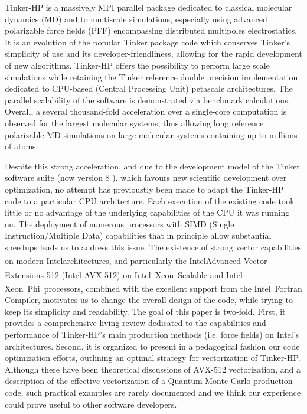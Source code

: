 \documentclass[9pt,comparison]{livecoms}
\newcommand{\rr}{\textsuperscript{\textregistered}}
\newcommand{\tm}{\textsuperscript{\texttrademark}}
\begin{document}
\hspace{\parindent}Tinker-HP is a massively MPI parallel package dedicated to classical molecular dynamics (MD) and to multiscale simulations, especially using advanced polarizable force fields (PFF) encompassing distributed multipoles electrostatics\cite{Tinker-HP}.
It is an evolution of the popular Tinker package code \cite{Tinker8} which conserves Tinker's simplicity of use and its developer-friendliness, allowing for the rapid development of new algorithms. Tinker-HP offers the possibility to perform large scale simulations while retaining the Tinker reference double precision implementation dedicated to CPU-based (Central Processing Unit) petascale architectures. The parallel scalability of the software is demonstrated via benchmark calculations. Overall, a several thousand-fold acceleration over a single-core computation is observed for the largest molecular systems, thus allowing long reference polarizable MD simulations on large molecular systems containing up to millions of atoms. 

Despite this strong acceleration, and due to the development model of the Tinker software suite (now version 8 \cite{Tinker8}), which favours new scientific development over optimization, no attempt has previoustly been made to adapt the Tinker-HP code to a particular CPU architecture. Each execution of the existing code took little or no advantage of the underlying capabilities of the CPU it was running on. The deployment of numerous processors with SIMD (Single Instruction/Multiple Data) capabilities that in principle allow substantial speedups leads us to address this issue. The existence of strong vector capabilities on modern Intel\rr  architectures, and particularly the Intel\rr Advanced Vector Extensions 512 (Intel AVX-512) on Intel\rr\ Xeon\rr\ Scalable and Intel Xeon\rr\ Phi\tm\ processors, combined with the excellent support from the Intel\rr\ Fortran Compiler, motivates us to change the overall design of the code, while trying to keep its simplicity and readability. The goal of this paper is two-fold. First, it provides a comprehensive living review dedicated to the capabilities and performance of Tinker-HP's main production methods (i.e. force fields) on Intel's architectures. Second, it is organized to present in a pedagogical fashion our code optimization efforts, outlining an optimal strategy for vectorization of Tinker-HP. Although there have been theoretical discussions of AVX-512 vectorization\cite{Shabanov2019}, and a description of the effective vectorization of a Quantum Monte-Carlo production code\cite{QMCpackavx}, such practical examples are rarely documented and we think our experience could prove useful to other software developers.
\end{document}
